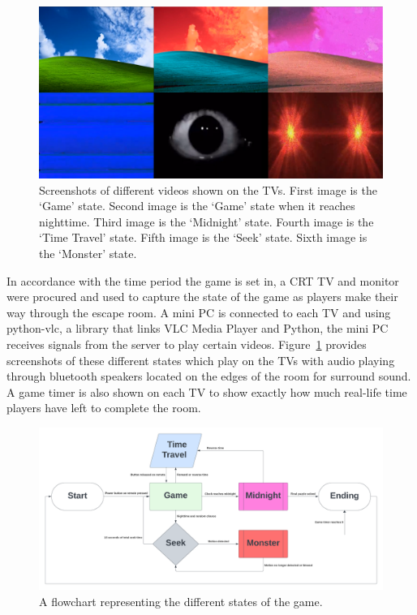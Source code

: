 \documentclass[conference]{IEEEtran}
\begin{document}
\begin{figure}[ht]
    \centering
    \includegraphics[width=0.90\columnwidth]{Images/TV_States.png}
    \caption{Screenshots of different videos shown on the TVs. First image is the `Game' state.
    Second image is the `Game' state when it reaches nighttime. Third image is the `Midnight' state. 
    Fourth image is the `Time Travel' state. Fifth image is the `Seek' state. Sixth image is the `Monster' state.}
    \label{fig:tv}
\end{figure}

\indent In accordance with the time period the game is set in, a CRT TV and monitor were procured and used to capture the state of the game
as players make their way through the escape room. A mini PC is connected to each TV and using python-vlc, a library that links VLC Media Player
and Python, the mini PC receives signals from the server to play certain videos. Figure~\ref{fig:tv} provides screenshots of these different states
which play on the TVs with audio playing through bluetooth speakers located on the edges of the room for surround sound. A game timer is also shown
on each TV to show exactly how much real-life time players have left to complete the room.

\begin{figure}[ht]
    \centering
    \includegraphics[width=0.90\columnwidth]{Images/state_flow.png}
    \caption{A flowchart representing the different states of the game.}
    \label{fig:pir}
\end{figure}
\end{document}
